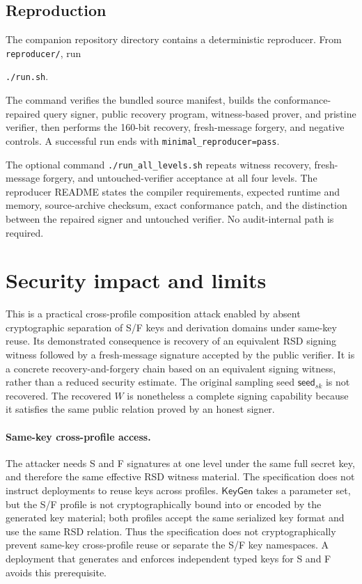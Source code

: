 \documentclass[11pt,a4paper]{article}
\newcommand{\KeyGen}{\ensuremath{\mathsf{KeyGen}}}
\begin{document}
\subsection{Reproduction}

The companion repository directory contains a deterministic reproducer.  From
\texttt{reproducer/}, run
\begin{center}
\texttt{./run.sh}.
\end{center}
The command verifies the bundled source manifest, builds the conformance-repaired
query signer, public recovery program, witness-based prover, and pristine
verifier, then performs the 160-bit recovery, fresh-message forgery, and negative
controls.  A successful run ends with
\texttt{minimal\_reproducer=pass}.

The optional command \texttt{./run\_all\_levels.sh} repeats witness recovery,
fresh-message forgery, and untouched-verifier acceptance at all four levels. The
reproducer README states the compiler requirements, expected runtime and memory,
source-archive checksum, exact conformance patch, and the distinction between
the repaired signer and untouched verifier.  No audit-internal path is required.

\section{Security impact and limits}

This is a practical cross-profile composition attack enabled by absent
cryptographic separation of S/F keys and derivation domains under same-key
reuse.  Its
demonstrated consequence is recovery of an equivalent RSD signing witness
followed by a fresh-message signature accepted by the public verifier.  It is a
concrete recovery-and-forgery chain based on an equivalent signing witness,
rather than a reduced security estimate.  The original sampling seed
$\mathsf{seed}_{sk}$ is not recovered.  The recovered $W$ is nonetheless a
complete signing capability because it satisfies the same public relation
proved by an honest signer.

\paragraph{Same-key cross-profile access.}
The attacker needs S and F signatures at one level under the same full secret
key, and therefore the same effective RSD witness material.  The specification
does not instruct deployments to reuse keys across profiles.  \KeyGen{} takes a
parameter set, but the S/F profile is not cryptographically bound into or
encoded by the generated key material; both profiles accept the same serialized
key format and use the same RSD relation.  Thus the specification does not
cryptographically prevent same-key cross-profile reuse or separate the S/F key
namespaces.  A deployment that generates and enforces independent typed keys
for S and F avoids this prerequisite.
\end{document}
